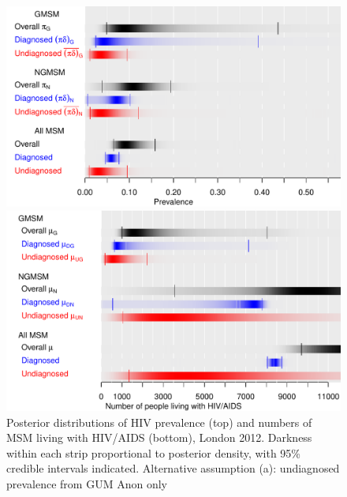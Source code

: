 \documentclass[12pt]{article}\usepackage[]{graphicx}\usepackage[]{color}
\makeatletter
\def\maxwidth{ %
  \ifdim\Gin@nat@width>\linewidth
    \linewidth
  \else
    \Gin@nat@width
  \fi
}
\newenvironment{knitrout}{}{} %
\makeatother
\begin{document}
\begin{figure}
\begin{knitrout}
\color{fgcolor}
\includegraphics[width=\maxwidth]{figure/prevnums-nogu-1} 

\includegraphics[width=\maxwidth]{figure/prevnums-nogu-2} 

\end{knitrout}
  \caption{Posterior distributions of HIV prevalence (top) and numbers of MSM living with HIV/AIDS (bottom), London 2012. Darkness within each strip proportional to posterior density, with 95\% credible intervals indicated. Alternative assumption (a): undiagnosed prevalence from GUM Anon only }
  \label{fig:res:prev}
\end{figure}
\end{document}
